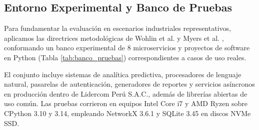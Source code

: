 \documentclass[conference]{IEEEtran}
\begin{document}
\subsection{Entorno Experimental y Banco de Pruebas}
Para fundamentar la evaluación en escenarios industriales representativos, aplicamos las directrices metodológicas de Wohlin et al. \cite{wohlin2012experimentation} y Myers et al. \cite{myers2011art}, conformando un banco experimental de 8 microservicios y proyectos de software en Python (Tabla \ref{tab:banco_pruebas}) correspondientes a casos de uso reales.

El conjunto incluye sistemas de analítica predictiva, procesadores de lenguaje natural, pasarelas de autenticación, generadores de reportes y servicios asíncronos en producción dentro de Lidercom Perú S.A.C., además de librerías abiertas de uso común. Las pruebas corrieron en equipos Intel Core i7 y AMD Ryzen sobre CPython 3.10 y 3.14, empleando NetworkX 3.6.1 y SQLite 3.45 en discos NVMe SSD.

\begin{table}[!t]
\centering
\caption{Caracterización del Banco de Pruebas Experimental de Microservicios y Proyectos Python}
\label{tab:banco_pruebas}
\small
{}
\end{table}
\end{document}
